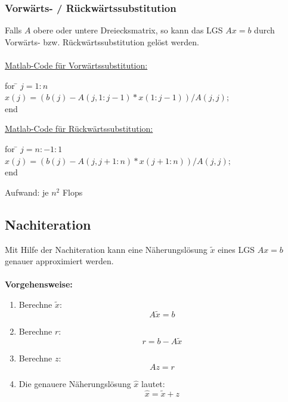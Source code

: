 \documentclass[4pt,a4paper]{scrartcl}
\begin{document}
\begin{multicols}{4}
\subsubsection{Vorwärts- / Rückwärtssubstitution}
Falls $A$ obere oder untere Dreiecksmatrix, so kann das LGS $Ax=b$ durch Vorwärts- bzw. Rückwärtssubstitution gelöst werden.\\\\
\underline{Matlab-Code für Vorwärtssubstitution:}
\begin{tabbing}
for \= $j=1:n$\\
\>$x(j)=(b(j)-A(j,1:j-1)*x(1:j-1))/A(j,j);$\\
end
\end{tabbing}
\underline{Matlab-Code für Rückwärtssubstitution:}
\begin{tabbing}
for \= $j=n:-1:1$\\
\>$x(j)=(b(j)-A(j,j+1:n)*x(j+1:n))/A(j,j);$\\
end
\end{tabbing}
Aufwand: je $n^2$ Flops

\subsection{Nachiteration}
Mit Hilfe der Nachiteration kann eine Näherungslösung $\tilde{x}$ eines LGS $Ax=b$ genauer approximiert werden.\\\\
\textbf{Vorgehensweise:}
\begin{enumerate}
\item Berechne $\tilde{x}$:
\begin{equation*}
A\tilde{x}=b
\end{equation*}
\item Berechne $r$:
\begin{equation*}
r=b-A\tilde{x}
\end{equation*}
\item Berechne $z$:
\begin{equation*}
Az=r
\end{equation*}
\item Die genauere Näherungslösung $\hat{x}$ lautet:
\begin{equation*}
\hat{x}=\tilde{x}+z
\end{equation*}
\end{enumerate}


\end{multicols}
\end{document}
